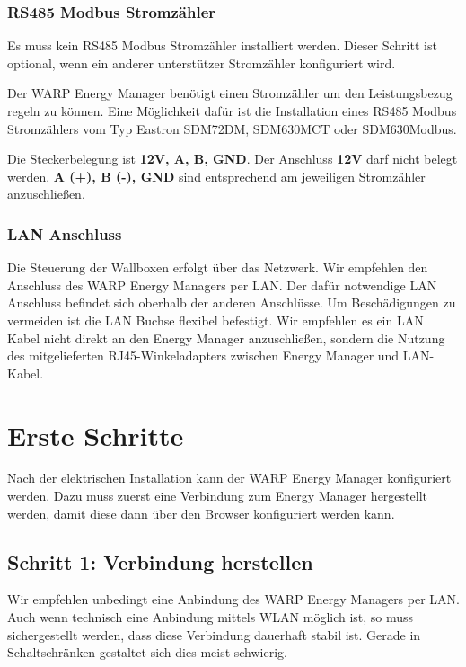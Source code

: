 \documentclass[a4paper,10pt]{article}
\newcommand{\hint}[1]{\begin{tcolorbox}[colback=boxgray,colframe=black,coltext=
white,title=Hinweis,left*=2mm,right*=2mm,boxsep=1mm,bottom=1mm,top=1mm]#1\end{tcolorbox}}
\begin{document}
\begin{multicols*}{2}
	\subsubsection{RS485 Modbus Stromzähler}
	\hint{Es muss kein RS485 Modbus Stromzähler installiert werden. Dieser
	Schritt ist optional, wenn ein anderer unterstützer Stromzähler konfiguriert
	wird.}

	Der WARP Energy Manager benötigt einen Stromzähler um den Leistungsbezug regeln zu 
	können. Eine Möglichkeit dafür ist die Installation eines RS485 Modbus
	Stromzählers vom Typ Eastron SDM72DM, SDM630MCT oder SDM630Modbus.
	
	Die Steckerbelegung ist \textbf{12V, A, B, GND}. Der Anschluss \textbf{12V}
	darf nicht belegt werden. \textbf{A (+), B (-), GND} sind entsprechend 
	am jeweiligen Stromzähler anzuschließen.

	\subsubsection{LAN Anschluss}
	Die Steuerung der Wallboxen erfolgt über das Netzwerk. Wir empfehlen den
	Anschluss des WARP Energy Managers per LAN. Der dafür notwendige LAN
	Anschluss befindet sich oberhalb der anderen Anschlüsse. Um Beschädigungen
	zu vermeiden ist die LAN Buchse flexibel befestigt. Wir empfehlen es ein LAN
	Kabel nicht direkt an den Energy Manager anzuschließen, sondern die Nutzung 
	des mitgelieferten RJ45-Winkeladapters zwischen Energy Manager und
	LAN-Kabel.

	\newpage
	\section{Erste Schritte}
	\label{setup}

	Nach der elektrischen Installation kann der WARP Energy Manager konfiguriert
	werden. Dazu muss zuerst eine Verbindung zum Energy Manager hergestellt werden, 
	damit diese dann über den Browser konfiguriert werden kann.

	\subsection{Schritt 1: Verbindung herstellen}


	\hint{Wir empfehlen unbedingt eine Anbindung des WARP Energy Managers per
	LAN. Auch wenn technisch eine Anbindung mittels WLAN möglich ist, so muss
	sichergestellt werden, dass diese Verbindung dauerhaft stabil ist. Gerade in
	Schaltschränken gestaltet sich dies meist schwierig.}


\end{multicols*}
\end{document}
